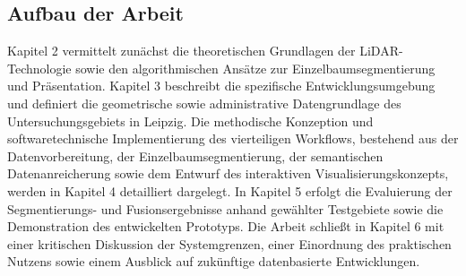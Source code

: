 \subsection{Aufbau der Arbeit}

Kapitel 2 vermittelt zunächst die theoretischen Grundlagen der LiDAR-Technologie sowie den algorithmischen Ansätze zur Einzelbaumsegmentierung und Präsentation. Kapitel 3 beschreibt die spezifische Entwicklungsumgebung und definiert die geometrische sowie administrative Datengrundlage des Untersuchungsgebiets in Leipzig. Die methodische Konzeption und softwaretechnische Implementierung des vierteiligen Workflows, bestehend aus der Datenvorbereitung, der Einzelbaumsegmentierung, der semantischen Datenanreicherung sowie dem Entwurf des interaktiven Visualisierungskonzepts, werden in Kapitel 4 detailliert dargelegt. In Kapitel 5 erfolgt die Evaluierung der Segmentierungs- und Fusionsergebnisse anhand gewählter Testgebiete sowie die Demonstration des entwickelten Prototyps. Die Arbeit schließt in Kapitel 6 mit einer kritischen Diskussion der Systemgrenzen, einer Einordnung des praktischen Nutzens sowie einem Ausblick auf zukünftige datenbasierte Entwicklungen.